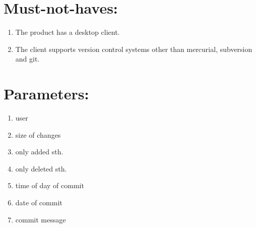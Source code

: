 \documentclass[10pt,a4paper]{article}
\begin{document}
\section{Must-not-haves:}
\begin{enumerate}
\item The product has a desktop client.
\item The client supports version control systems other than mercurial, subversion and git.
\end{enumerate}
\section{Parameters:}
\begin{enumerate}
\item user
\item size of changes
\item only added sth.
\item only deleted sth.
\item time of day of commit
\item date of commit
\item commit message
\end{enumerate}
\end{document}
